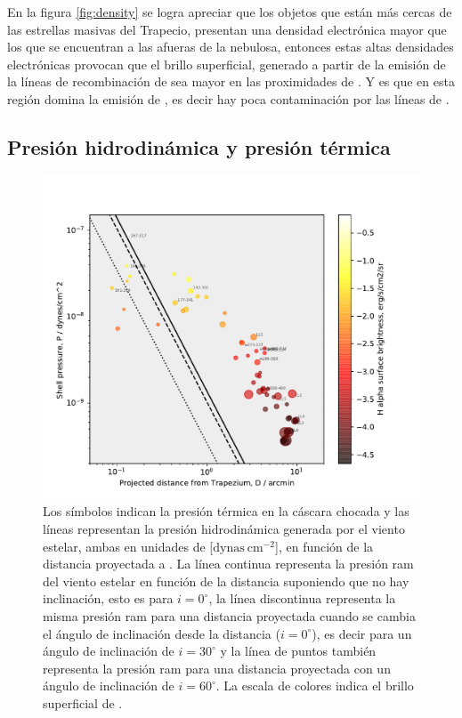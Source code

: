 En la figura \ref{fig:density} se logra apreciar que los objetos que están más cercas de las estrellas masivas del Trapecio, presentan una densidad electrónica mayor que los que se encuentran a las afueras de la nebulosa, entonces estas altas densidades electrónicas provocan que el brillo superficial, generado a partir de la emisión de la líneas de recombinación de \ha{} sea mayor en las proximidades de \thC{}. Y es que en esta región domina la emisión de \ha, es decir hay poca contaminación por las líneas de  \nii{}.\\


\subsection{Presión hidrodinámica y presión térmica }
\label{sec:pressure}

\begin{figure}
  \centering
  \includegraphics[width=\linewidth, clip]{luis-programas/will-Pshell-vs-D.pdf}
  \caption{Los símbolos indican la presión térmica en la cáscara chocada  y las líneas representan la presión hidrodinámica generada por el viento estelar, ambas en unidades de [\(\mathrm{dynas~cm^{-2}}\)], en función de la distancia proyectada a \thC{}. La línea continua representa la presión ram del viento estelar en función de la distancia suponiendo que no hay inclinación, esto es para \(i = 0^{\circ}\), la línea discontinua representa la misma presión ram para una distancia proyectada cuando se cambia el ángulo de inclinación desde la distancia (\(i = 0^{\circ}\)), es decir para un ángulo de inclinación de \(i = 30^{\circ}\) y la línea de puntos también representa la presión ram para una distancia proyectada con un ángulo de inclinación de \(i = 60^{\circ}\). La escala de colores indica el brillo superficial de \ha{}. }
 \label{fig:pressure}
\end{figure}

